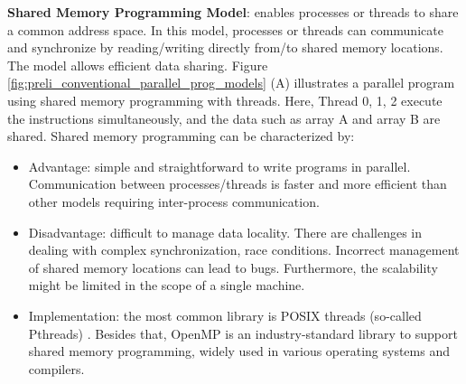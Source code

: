 \noindent \textbf{Shared Memory Programming Model}: enables processes or threads to share a common address space. In this model, processes or threads can communicate and synchronize by reading/writing directly from/to shared memory locations. The model allows efficient data sharing. Figure \ref{fig:preli_conventional_parallel_prog_models} (A) illustrates a parallel program using shared memory programming with threads. Here, Thread 0, 1, 2 execute the instructions simultaneously, and the data such as array A and array B are shared. Shared memory programming can be characterized by:
\begin{itemize}
	\item Advantage: simple and straightforward to write programs in parallel. Communication between processes/threads is faster and more efficient than other models requiring inter-process communication.
	\item Disadvantage: difficult to manage data locality. There are challenges in dealing with complex synchronization, race conditions. Incorrect management of shared memory locations can lead to bugs. Furthermore, the scalability might be limited in the scope of a single machine.
	\item Implementation: the most common library is POSIX threads (so-called Pthreads) \cite{butenhof1997programming}. Besides that, OpenMP \cite{dagum1998openmp} is an industry-standard library to support shared memory programming, widely used in various operating systems and compilers. 
\end{itemize}


